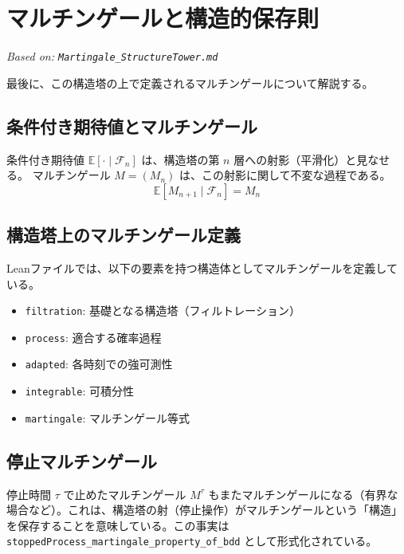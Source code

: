 \documentclass[a4paper,11pt]{ltjsarticle}
\theoremstyle{definition}
\newcommand{\F}{\mathcal{F}}
\newcommand{\Expect}{\mathbb{E}}
\newcommand{\CondExp}[2]{\Expect[#1 \mid #2]}
\newcommand{\Tau}{\tau}
\begin{document}
\section{マルチンゲールと構造的保存則}
\label{sec:martingale}
\textit{Based on: \texttt{Martingale\_StructureTower.md}}

最後に、この構造塔の上で定義されるマルチンゲールについて解説する。

\subsection{条件付き期待値とマルチンゲール}
条件付き期待値 $\CondExp{\cdot}{\F_n}$ は、構造塔の第 $n$ 層への射影（平滑化）と見なせる。
マルチンゲール $M = (M_n)$ は、この射影に関して不変な過程である。
\[ \CondExp{M_{n+1}}{\F_n} = M_n \]

\subsection{構造塔上のマルチンゲール定義}
Leanファイルでは、以下の要素を持つ構造体としてマルチンゲールを定義している。
\begin{itemize}
    \item \texttt{filtration}: 基礎となる構造塔（フィルトレーション）
    \item \texttt{process}: 適合する確率過程
    \item \texttt{adapted}: 各時刻での強可測性
    \item \texttt{integrable}: 可積分性
    \item \texttt{martingale}: マルチンゲール等式
\end{itemize}

\subsection{停止マルチンゲール}
停止時間 $\Tau$ で止めたマルチンゲール $M^\Tau$ もまたマルチンゲールになる（有界な場合など）。これは、構造塔の射（停止操作）がマルチンゲールという「構造」を保存することを意味している。この事実は \texttt{stoppedProcess\_martingale\_property\_of\_bdd} として形式化されている。
\end{document}
